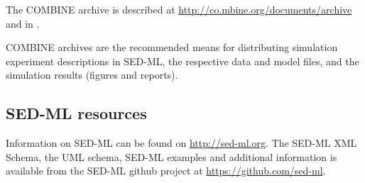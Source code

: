 The COMBINE archive is described at \url{http://co.mbine.org/documents/archive} and 
in \citep{Bergmann2014}.

COMBINE archives are the recommended means for distributing simulation experiment descriptions in SED-ML, the respective data and model files, and the simulation results (figures and reports).

\subsection{SED-ML resources}
\label{sec:resources}

Information on SED-ML can be found on \url{http://sed-ml.org}. The SED-ML XML Schema, the UML schema, SED-ML examples and additional information is available from the SED-ML github project at \url{https://github.com/sed-ml}.
